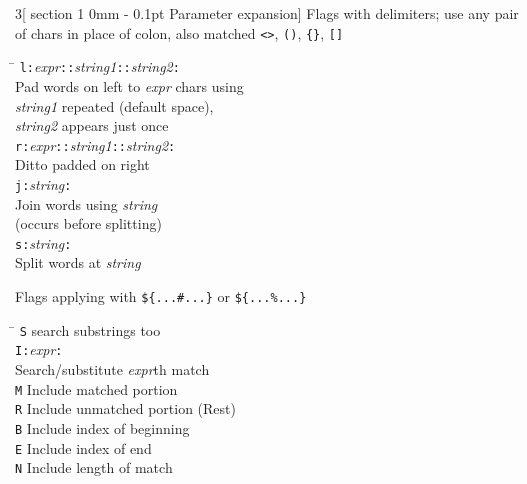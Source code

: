 \documentclass{article}
\makeatletter
\renewcommand{\section}{\@startsection
  {section}%
  {1}%
  {0mm}%
  {-\baselineskip}%
  {0.1pt}%
  {\normalfont\normalsize\scshape}} %
\newcommand\I[1]{\textsl{#1}}
\newcommand\T[1]{\texttt{#1}}
\makeatother
\begin{document}
\begin{multicols}{3}[\section{Parameter expansion}]
Flags with delimiters; use any pair of chars in place of colon, also
matched \verb!<>!, \verb!()!, \verb!{}!, \verb![]!
\begin{tabbing}
\hskip 20pt \= \kill
\T{l:}\I{expr}\T{::}\I{string1}\T{::}\I{string2}\T{:} \\
                \> Pad words on left to \I{expr} chars using \\
                \> \I{string1} repeated (default space), \\
                \> \I{string2} appears just once \\
\T{r:}\I{expr}\T{::}\I{string1}\T{::}\I{string2}\T{:} \\
                \> Ditto padded on right \\
\T{j:}\I{string}\T{:} \\
                \> Join words using \I{string} \\
                \> (occurs before splitting) \\
\T{s:}\I{string}\T{:} \\
                \> Split words at \I{string}
\end{tabbing}

Flags applying with \verb!${...#...}! or \verb!${...%...}!
\begin{tabbing}
\hskip 20pt \= \kill
\T{S}           \> search substrings too \\
\T{I:}\I{expr}\T{:} \\
                \> Search/substitute \I{expr\/}th match \\
\T{M}           \> Include matched portion \\
\T{R}           \> Include unmatched portion (Rest) \\
\T{B}           \> Include index of beginning \\
\T{E}           \> Include index of end \\
\T{N}           \> Include length of match \\
\end{tabbing}


\end{multicols}
\end{document}
